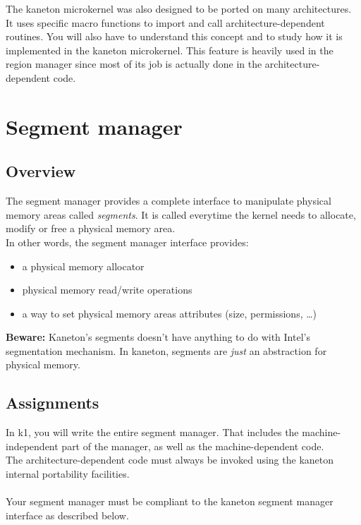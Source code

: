 The kaneton microkernel was also designed to be ported on many
architectures. It uses specific macro functions to import and call
architecture-dependent routines. You will also have
to understand this concept and to study how it is implemented in the
kaneton microkernel. This feature is heavily used in the region manager since
most of its job is actually done in the architecture-dependent code.

%
%

\newpage

\section{Segment manager}

\subsection*{Overview}
The segment manager provides a complete interface to manipulate physical
memory areas called {\em segments}. It is called everytime the kernel
needs to allocate, modify or free a physical memory area.\\

In other words, the segment manager interface provides:
\begin{itemize}
\item a physical memory allocator
\item physical memory read/write operations
\item a way to set physical memory areas attributes (size, permissions, \ldots)
\end{itemize}

\textbf{Beware:} Kaneton's segments doesn't have anything to do with Intel's segmentation mechanism.
In kaneton, segments are \textit{just} an abstraction for physical memory.

\subsection*{Assignments}
In k1, you will write the entire segment manager. That includes the
machine-independent part of the manager, as well as the machine-dependent
code.\\

The architecture-dependent code must always be invoked using the kaneton
internal portability facilities.\\
\\
Your segment manager must be compliant to the kaneton segment manager
interface as described below.

